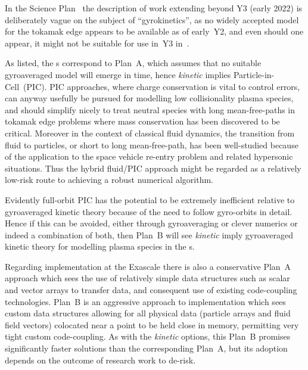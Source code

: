 In the Science Plan~\cite{sciplan} the description of work 
extending beyond Y3 (early 2022) is deliberately vague on the subject of ``gyrokinetics'', as no
widely accepted model for the tokamak edge appears to be available as of early~Y2,
and even should one appear, it might not be suitable for use in~Y3 in~\nep.

As listed, the \papp s correspond to Plan~A, which assumes that no suitable gyroaveraged
model will emerge in time, hence \emph{kinetic} implies Particle-in-Cell~(PIC).
PIC  approaches, where charge conservation
is vital to control errors, can anyway usefully be pursued
for modelling low collisionality plasma species, and should simplify nicely to 
treat neutral species with long mean-free-paths in tokamak edge problems
where mass conservation has been discovered to be
critical. Moreover in the context of classical fluid dynamics, 
the transition from fluid to particles, or short to long mean-free-path,
has been well-studied because of the
application to the space vehicle re-entry problem and related hypersonic situations.
Thus the hybrid fluid/PIC approach
might be regarded as a relatively low-risk route to achieving a robust
numerical algorithm.

Evidently full-orbit PIC has the potential to be extremely inefficient relative to 
gyroaveraged kinetic theory because of the need to follow gyro-orbits in detail. Hence
if this can be avoided, either through gyroaveraging or clever numerics or indeed
a combination of both,
then Plan~B will see \emph{kinetic} imply gyroaveraged kinetic theory for modelling plasma species
in the \papp s.

Regarding implementation at the Exascale there is also a
conservative Plan~A approach which sees the
use of relatively simple data structures such as scalar and vector arrays to transfer
data, and consequent use of existing code-coupling technologies.
Plan~B is an aggressive approach to implementation which sees
custom data structures allowing for all physical data (particle arrays
and fluid field vectors) colocated near a point to be
held close in memory, permitting very tight custom code-coupling. As with the
\emph{kinetic} options, this Plan~B promises significantly faster solutions than
the corresponding Plan~A, but its adoption depends on the outcome of research work
to de-risk.

